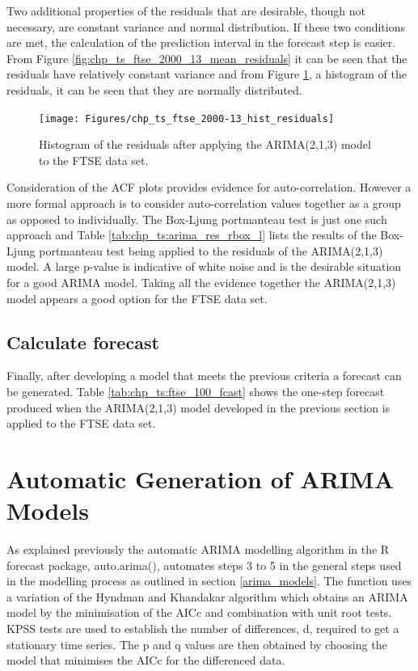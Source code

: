 Two additional properties of the residuals that are desirable, though not necessary, are constant variance and normal distribution. If these two conditions are met, the calculation of the prediction interval in the forecast step is easier. From Figure \ref{fig:chp_ts_ftse_2000_13_mean_residuals} it can be seen that the residuals have relatively constant variance and from Figure \ref{fig:chp_ts_ftse_2000_13_hist_residuals}, a histogram of the residuals, it can be seen that they are normally distributed.

\begin{figure}[!tbh]
\centering
\texttt{[image: Figures/chp\_ts\_ftse\_2000-13\_hist\_residuals]}
\caption[Histogram of the FTSE 100 ARIMA model residuals]{Histogram of the residuals after applying the ARIMA(2,1,3) model to the FTSE data set.}
\label{fig:chp_ts_ftse_2000_13_hist_residuals}
\end{figure}

Consideration of the ACF plots provides evidence for auto-correlation. However a more formal approach is to consider auto-correlation values together as a group as opposed to individually. The Box-Ljung portmanteau test is just one such approach and Table \ref{tab:chp_ts:arima_res_rbox_l} lists the results of the Box-Ljung portmanteau test being applied to the residuals of the ARIMA(2,1,3) model. A large p-value is indicative of white noise and is the desirable situation for a good ARIMA model. Taking all the evidence together the ARIMA(2,1,3) model appears a good option for the FTSE data set.



\subsection{Calculate forecast}
Finally, after developing a model that meets the previous criteria a forecast can be generated. Table \ref{tab:chp_ts:ftse_100_fcast} shows the one-step forecast produced when the ARIMA(2,1,3) model developed in the previous section is applied to the FTSE data set.
 


\section{Automatic Generation of ARIMA Models}
As explained previously the automatic ARIMA modelling algorithm in the R forecast package, auto.arima(), automates steps 3 to 5 in the general steps used in the modelling process as outlined in section \ref{arima_models}. The function uses a variation of the Hyndman and Khandakar algorithm which obtains an ARIMA model by the minimisation of the AICc and combination with unit root tests. KPSS tests are used to establish the number of differences, d, required to get a stationary time series. The p and q values are then obtained by choosing the model that minimises the AICc for the differenced data. 

